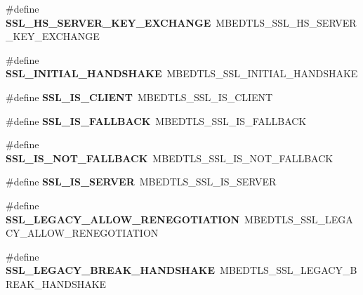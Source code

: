 \begin{DoxyCompactItemize}
\mbox{\label{compat-1_83_8h_ab9903e824d585f667a0018fa459dc30a}} 
\#define {\bfseries S\+S\+L\+\_\+\+H\+S\+\_\+\+S\+E\+R\+V\+E\+R\+\_\+\+K\+E\+Y\+\_\+\+E\+X\+C\+H\+A\+N\+GE}~M\+B\+E\+D\+T\+L\+S\+\_\+\+S\+S\+L\+\_\+\+H\+S\+\_\+\+S\+E\+R\+V\+E\+R\+\_\+\+K\+E\+Y\+\_\+\+E\+X\+C\+H\+A\+N\+GE
\item 
\mbox{\label{compat-1_83_8h_a3a22bcc5982f8f2dbbc899b2d9c09b0d}} 
\#define {\bfseries S\+S\+L\+\_\+\+I\+N\+I\+T\+I\+A\+L\+\_\+\+H\+A\+N\+D\+S\+H\+A\+KE}~M\+B\+E\+D\+T\+L\+S\+\_\+\+S\+S\+L\+\_\+\+I\+N\+I\+T\+I\+A\+L\+\_\+\+H\+A\+N\+D\+S\+H\+A\+KE
\item 
\mbox{\label{compat-1_83_8h_a7d3c4f57b35a1b8c395ebd7451e2211b}} 
\#define {\bfseries S\+S\+L\+\_\+\+I\+S\+\_\+\+C\+L\+I\+E\+NT}~M\+B\+E\+D\+T\+L\+S\+\_\+\+S\+S\+L\+\_\+\+I\+S\+\_\+\+C\+L\+I\+E\+NT
\item 
\mbox{\label{compat-1_83_8h_a4b53466ef9f2abd82ab94bc5ca19ea2f}} 
\#define {\bfseries S\+S\+L\+\_\+\+I\+S\+\_\+\+F\+A\+L\+L\+B\+A\+CK}~M\+B\+E\+D\+T\+L\+S\+\_\+\+S\+S\+L\+\_\+\+I\+S\+\_\+\+F\+A\+L\+L\+B\+A\+CK
\item 
\mbox{\label{compat-1_83_8h_a7a0cc18c5f6cf8bca6d10e9f978921d1}} 
\#define {\bfseries S\+S\+L\+\_\+\+I\+S\+\_\+\+N\+O\+T\+\_\+\+F\+A\+L\+L\+B\+A\+CK}~M\+B\+E\+D\+T\+L\+S\+\_\+\+S\+S\+L\+\_\+\+I\+S\+\_\+\+N\+O\+T\+\_\+\+F\+A\+L\+L\+B\+A\+CK
\item 
\mbox{\label{compat-1_83_8h_a8fe8b6c95281a7048839f8b30713ff35}} 
\#define {\bfseries S\+S\+L\+\_\+\+I\+S\+\_\+\+S\+E\+R\+V\+ER}~M\+B\+E\+D\+T\+L\+S\+\_\+\+S\+S\+L\+\_\+\+I\+S\+\_\+\+S\+E\+R\+V\+ER
\item 
\mbox{\label{compat-1_83_8h_af85d1bdb4c936effdabd3b6bf3d953c5}} 
\#define {\bfseries S\+S\+L\+\_\+\+L\+E\+G\+A\+C\+Y\+\_\+\+A\+L\+L\+O\+W\+\_\+\+R\+E\+N\+E\+G\+O\+T\+I\+A\+T\+I\+ON}~M\+B\+E\+D\+T\+L\+S\+\_\+\+S\+S\+L\+\_\+\+L\+E\+G\+A\+C\+Y\+\_\+\+A\+L\+L\+O\+W\+\_\+\+R\+E\+N\+E\+G\+O\+T\+I\+A\+T\+I\+ON
\item 
\mbox{\label{compat-1_83_8h_a31c3d047a20d178a4228eb3740a7a24f}} 
\#define {\bfseries S\+S\+L\+\_\+\+L\+E\+G\+A\+C\+Y\+\_\+\+B\+R\+E\+A\+K\+\_\+\+H\+A\+N\+D\+S\+H\+A\+KE}~M\+B\+E\+D\+T\+L\+S\+\_\+\+S\+S\+L\+\_\+\+L\+E\+G\+A\+C\+Y\+\_\+\+B\+R\+E\+A\+K\+\_\+\+H\+A\+N\+D\+S\+H\+A\+KE

\end{DoxyCompactItemize}
